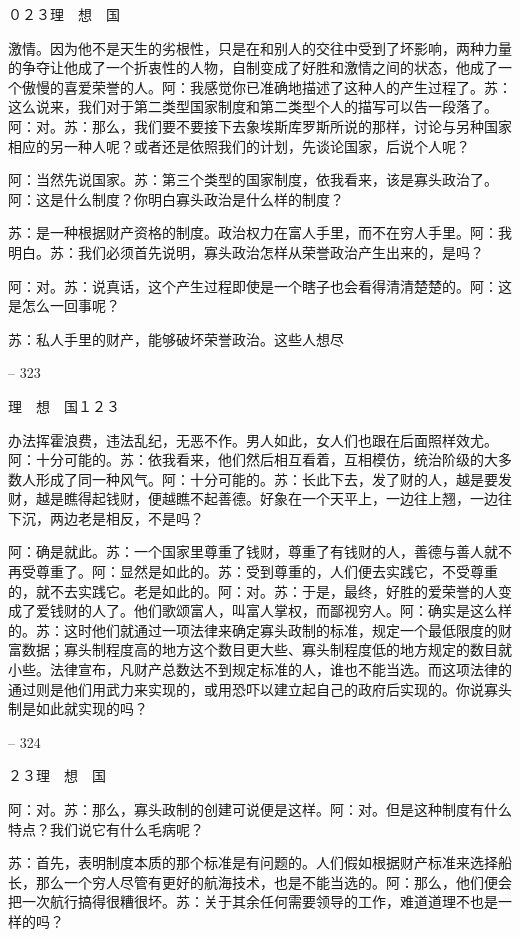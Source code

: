 \documentclass[11pt,oneside]{book}
\begin{document}
\begin{common-format}
    ０２３理　想　国

    激情。因为他不是天生的劣根性，只是在和别人的交往中受到了坏影响，两种力量的争夺让他成了一个折衷性的人物，自制变成了好胜和激情之间的状态，他成了一个傲慢的喜爱荣誉的人。阿：我感觉你已准确地描述了这种人的产生过程了。苏：这么说来，我们对于第二类型国家制度和第二类型个人的描写可以告一段落了。阿：对。苏：那么，我们要不要接下去象埃斯库罗斯所说的那样，讨论与另种国家相应的另一种人呢？或者还是依照我们的计划，先谈论国家，后说个人呢？

    阿：当然先说国家。苏：第三个类型的国家制度，依我看来，该是寡头政治了。阿：这是什么制度？你明白寡头政治是什么样的制度？

    苏：是一种根据财产资格的制度。政治权力在富人手里，而不在穷人手里。阿：我明白。苏：我们必须首先说明，寡头政治怎样从荣誉政治产生出来的，是吗？

    阿：对。苏：说真话，这个产生过程即使是一个瞎子也会看得清清楚楚的。阿：这是怎么一回事呢？

    苏：私人手里的财产，能够破坏荣誉政治。这些人想尽

    

-- 323

    理　想　国１２３

    办法挥霍浪费，违法乱纪，无恶不作。男人如此，女人们也跟在后面照样效尤。阿：十分可能的。苏：依我看来，他们然后相互看着，互相模仿，统治阶级的大多数人形成了同一种风气。阿：十分可能的。苏：长此下去，发了财的人，越是要发财，越是瞧得起钱财，便越瞧不起善德。好象在一个天平上，一边往上翘，一边往下沉，两边老是相反，不是吗？

    阿：确是就此。苏：一个国家里尊重了钱财，尊重了有钱财的人，善德与善人就不再受尊重了。阿：显然是如此的。苏：受到尊重的，人们便去实践它，不受尊重的，就不去实践它。老是如此的。阿：对。苏：于是，最终，好胜的爱荣誉的人变成了爱钱财的人了。他们歌颂富人，叫富人掌权，而鄙视穷人。阿：确实是这么样的。苏：这时他们就通过一项法律来确定寡头政制的标准，规定一个最低限度的财富数据；寡头制程度高的地方这个数目更大些、寡头制程度低的地方规定的数目就小些。法律宣布，凡财产总数达不到规定标准的人，谁也不能当选。而这项法律的通过则是他们用武力来实现的，或用恐吓以建立起自己的政府后实现的。你说寡头制是如此就实现的吗？

    

-- 324

    ２３理　想　国

    阿：对。苏：那么，寡头政制的创建可说便是这样。阿：对。但是这种制度有什么特点？我们说它有什么毛病呢？

    苏：首先，表明制度本质的那个标准是有问题的。人们假如根据财产标准来选择船长，那么一个穷人尽管有更好的航海技术，也是不能当选的。阿：那么，他们便会把一次航行搞得很糟很坏。苏：关于其余任何需要领导的工作，难道道理不也是一样的吗？


\end{common-format}
\end{document}
